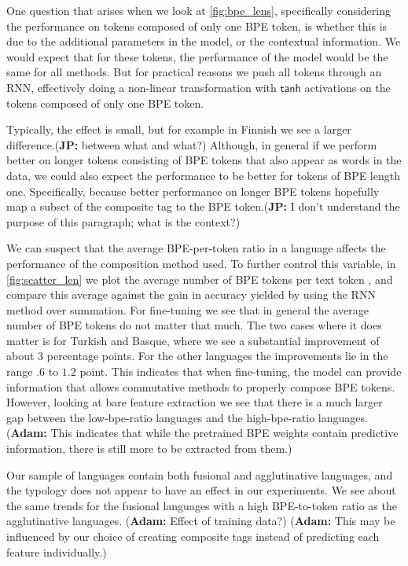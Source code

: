 \documentclass[11pt]{article}
\newcommand\jp[1]{(\textbf{JP:} #1)}
\newcommand\adam[1]{(\textbf{Adam:} #1)}
\begin{document}
       One question that arises when we
     look at \cref{fig:bpe_lens}, specifically considering the
     performance on tokens composed of only one BPE token, is whether
     this is due to the additional parameters in the model, or the
     contextual information. We would expect that for these tokens,
     the performance of the model would be the same for all
     methods. But for practical reasons we push all tokens through an
     RNN, effectively doing a non-linear transformation with $\mathsf{tanh}$
     activations on the tokens composed of only one BPE token.

        Typically, the effect is small, but for example in Finnish we
     see a larger difference.\jp{between what and what?} Although, in general if we perform
     better on longer tokens consisting of BPE tokens that also appear
     as words in the data, we could also expect the performance
     to be better for tokens of BPE length one. Specifically,
     because better performance on longer BPE tokens hopefully map a
     subset of the composite tag to the BPE token.\jp{I don't understand the purpose of this paragraph; what is the context?}

     We can suspect %
     that the average
     BPE-per-token ratio in a language affects the performance of the composition method
     used. To further control this variable, in \cref{fig:scatter_len} we plot the average number of BPE
     tokens per text token 
     , and compare this average against the gain in
     accuracy yielded by using the RNN method over summation.  For
     fine-tuning we see that in general the average number of BPE
     tokens do not matter that much. The two cases where it does
     matter is for Turkish and Basque, where we see a substantial
     improvement of about $3$ percentage points. For the other
     languages the improvements lie in the range $.6$ to $1.2$ point. This
     indicates that when fine-tuning, the model can provide information
     that allows commutative methods to properly compose BPE tokens.
      However, looking at bare feature extraction we see that there is a
     much larger gap between the low-bpe-ratio languages and the
     high-bpe-ratio languages. \adam{This indicates that while the
     pretrained BPE weights contain predictive information, there is
     still more to be extracted from them.}

        Our sample of languages contain both fusional and
     agglutinative languages, and the typology does not appear to have
     an effect in our experiments. We see about the same trends for
     the fusional languages with a high BPE-to-token ratio as the
     agglutinative languages. 
    \adam{Effect of training data?}
    \adam{This may be influenced by our choice of creating composite tags instead of predicting each feature individually.}
\end{document}
